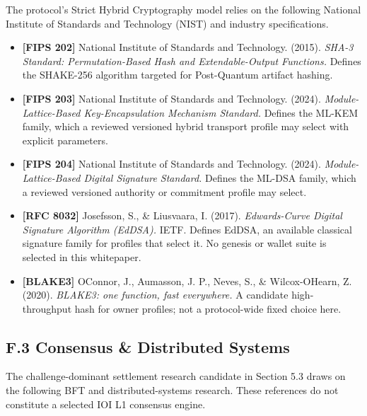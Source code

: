 \documentclass[
  11pt,
]{article}
\providecommand{\tightlist}{%
  \setlength{\itemsep}{0pt}\setlength{\parskip}{0pt}}
\begin{document}
The protocol's Strict Hybrid Cryptography model relies on the following
National Institute of Standards and Technology (NIST) and industry
specifications.

\begin{itemize}
\tightlist
\item
  \textbf{{[}FIPS 202{]}} National Institute of Standards and
  Technology. (2015). \emph{SHA-3 Standard: Permutation-Based Hash and
  Extendable-Output Functions.} Defines the SHAKE-256 algorithm targeted
  for Post-Quantum artifact hashing.
\item
  \textbf{{[}FIPS 203{]}} National Institute of Standards and
  Technology. (2024). \emph{Module-Lattice-Based Key-Encapsulation
  Mechanism Standard.} Defines the ML-KEM family, which a reviewed
  versioned hybrid transport profile may select with explicit parameters.
\item
  \textbf{{[}FIPS 204{]}} National Institute of Standards and
  Technology. (2024). \emph{Module-Lattice-Based Digital Signature
  Standard.} Defines the ML-DSA family, which a reviewed versioned
  authority or commitment profile may select.
\item
  \textbf{{[}RFC 8032{]}} Josefsson, S., \& Liusvaara, I. (2017).
  \emph{Edwards-Curve Digital Signature Algorithm (EdDSA).} IETF.
  Defines EdDSA, an available classical signature family for profiles that
  select it. No genesis or wallet suite is selected in this whitepaper.
\item
  \textbf{{[}BLAKE3{]}} O\textquotesingle Connor, J., Aumasson, J. P.,
  Neves, S., \& Wilcox-O\textquotesingle Hearn, Z. (2020). \emph{BLAKE3:
  one function, fast everywhere.} A candidate high-throughput hash for
  owner profiles; not a protocol-wide fixed choice here.
\end{itemize}

\hypertarget{f.3-consensus-distributed-systems}{%
\subsection{F.3 Consensus \& Distributed
Systems}\label{f.3-consensus-distributed-systems}}

The challenge-dominant settlement research candidate in Section 5.3 draws on
the following BFT and distributed-systems research. These references do not
constitute a selected IOI L1 consensus engine.
\end{document}
